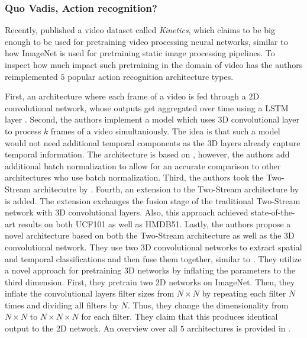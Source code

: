 \subsubsection{Quo Vadis, Action recognition?}
\label{sec:quovadis}
Recently, \cite{carreira_quo_2017} published a video dataset called \textit{Kinetics}, which claims to be big enough to be used for pretraining video processing neural networks, similar to how ImageNet \cite{deng_imagenet:_2009} is used for pretraining static image processing pipelines.
To inspect how much impact such pretraining in the domain of video has the authors reimplemented $5$ popular action recognition architecture types.

First, an architecture where each frame of a video is fed through a 2D convolutional network, whose outputs get aggregated over time using a LSTM layer \cite{hochreiter_long_1997}.
Second, the authors implement a model which uses 3D convolutional layer to process $k$ frames of a video simultaniously.
The idea is that such a model would not need additional temporal components as the 3D layers already capture temporal information.
The architecture is based on \cite{tran_learning_2015}, however, the authors add additional batch normalization to allow for an accurate comparison to other architectures who use batch normalization.
Third, the authors took the Two-Stream architecutre by \cite{simonyan_two-stream_2014}.
Fourth, an extension to the Two-Stream architecture by \cite{feichtenhofer_convolutional_2016} is added.
The extension exchanges the fusion stage of the traditional Two-Stream network with 3D convolutional layers.
Also, this approach achieved state-of-the-art results on both UCF101 as well as HMDB51.
Lastly, the authors propose a novel architecture based on both the Two-Stream architecture as well as the 3D convolutional network.
They use two 3D convolutional networks to extract spatial and temporal classifications and then fuse them together, similar to \cite{simonyan_two-stream_2014}.
They utilize a novel approach for pretraining 3D networks by inflating the parameters to the third dimension.
First, they pretrain two 2D networks on ImageNet.
Then, they inflate the convolutional layers filter sizes from $N \times N$ by repeating each filter $N$ times and dividing all filters by $N$.
Thus, they change the dimensionality from $N \times N$ to $N \times N \times N$ for each filter.
They claim that this produces identical output to the 2D network. 
An overview over all $5$ architectures is provided in .

